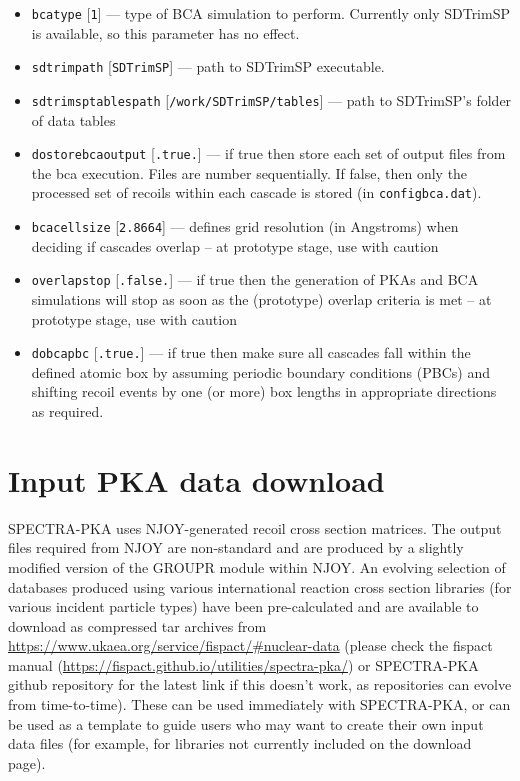 \documentclass[a4paper]{article}
\begin{document}
\begin{itemize}
\item \texttt{bca{\textunderscore}type} [\texttt{1}] --- type of BCA simulation to perform. Currently only SDTrimSP is available, so this parameter has no effect.

\item \texttt{sdtrim{\textunderscore}path} [\texttt{SDTrimSP}] --- path to SDTrimSP executable.

\item \texttt{sdtrimsptablespath} [\texttt{/work/SDTrimSP/tables}] --- path to SDTrimSP's folder of data tables

\item \texttt{do{\textunderscore}store{\textunderscore}bca{\textunderscore}output} [\texttt{.true.}] --- if true then store each set of output files from the bca execution. Files are number sequentially. If false, then only the processed set of recoils within each cascade is stored (in \texttt{config{\textunderscore}bca.dat}).

\item \texttt{bca{\textunderscore}cell{\textunderscore}size} [\texttt{2.8664}] --- defines grid resolution (in Angstroms) when deciding if cascades overlap -- at prototype stage, use with caution

\item \texttt{overlap{\textunderscore}stop} [\texttt{.false.}] --- if true then the generation of PKAs and BCA simulations will stop as soon as the (prototype) overlap criteria is met -- at prototype stage, use with caution

\item \texttt{do{\textunderscore}bca{\textunderscore}pbc} [\texttt{.true.}] --- if true then make sure all cascades fall within the defined atomic box by assuming periodic boundary conditions (PBCs) and shifting recoil events by one (or more) box lengths in appropriate directions as required.


\end{itemize}


\section{Input PKA data download}

SPECTRA-PKA uses NJOY-generated recoil cross section matrices. The output files required from NJOY are non-standard and are produced by a slightly modified version of the GROUPR module within NJOY. An evolving selection of databases produced using various international reaction cross section libraries (for various incident particle types) have been pre-calculated and are available to download as compressed tar archives from \url{https://www.ukaea.org/service/fispact/#nuclear-data} (please check the fispact manual (\url{https://fispact.github.io/utilities/spectra-pka/}) or SPECTRA-PKA github repository for the latest link if this doesn't work, as repositories can evolve from time-to-time). These can be used immediately with SPECTRA-PKA, or can be used as a template to guide users who may want to create their own input data files (for example, for libraries not currently included on the download page).
\end{document}
